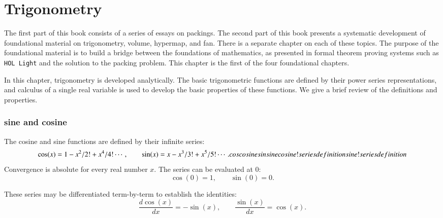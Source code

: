 
\chapter{Trigonometry}\label{part:trig}

The first part of this book consists of a series of essays
on packings.  The second part of this book presents
a systematic development of foundational material on
trigonometry, volume, hypermap, and fan.  There is a separate
chapter on each of these topics.  The purpose of the
foundational material is to build a bridge between
the foundations of mathematics, as presented in formal
theorem proving systems such as {\tt HOL Light} and the
solution to the packing problem.  
This chapter is the first of the four foundational chapters.


In this chapter, trigonometry is developed analytically.  The basic
trigonometric functions are defined by their power series
representations, and calculus of a single real variable is used to
develop the basic properties of these functions.  We give a brief
review of the definitions and properties.


\subsection{sine and cosine}

The cosine and sine functions are defined by their infinite series:%
%
    \begin{equation}\label{eqn:cos-def}\cos(x) = 1 - x^2/2! + x^4/4! \cdots,\qquad
  \sin(x) = x - x^3/3! + x^5/5! \cdots.
    \indy{Index}{cos}
    \indy{Index}{cosine}
    \indy{Index}{sin}
    \indy{Index}{sine}
    \indy{Index}{cosine!series definition}
    \indy{Index}{sine!series definition}
    \end{equation}
Convergence is absolute for every real number $x$.
The series can be evaluated at $0$:
    \begin{equation}\label{eqn:cos0}
    \cos(0) = 1,\qquad \sin(0) = 0.
    \end{equation}

These series may be differentiated term-by-term to establish the identities:
    \begin{equation}\label{eqn:cos'}
    \frac{d \cos(x)}{dx} = -\sin(x),\qquad \frac{ \sin(x)}{dx} = \cos(x).
    \end{equation}

